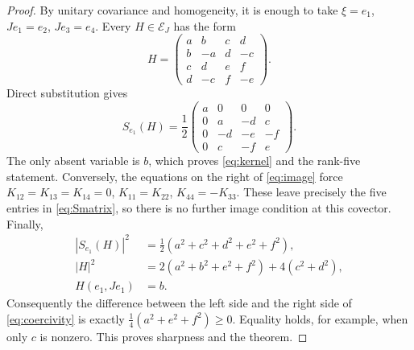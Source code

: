 \documentclass[11pt,a4paper]{article}
\numberwithin{equation}{section}
\theoremstyle{definition}\newtheorem{hypothesis}[theorem]{Input}
\theoremstyle{remark}\newtheorem{remark}[theorem]{Remark}
\begin{document}
\begin{proof}
By unitary covariance and homogeneity, it is enough to take $\xi=e_1$,
$Je_1=e_2$, $Je_3=e_4$.  Every $H\in\mathcal E_J$ has the form
\begin{equation}\label{eq:Hmatrix}
 H=\begin{pmatrix}
 a&b&c&d\\ b&-a&d&-c\\ c&d&e&f\\ d&-c&f&-e
 \end{pmatrix}.
\end{equation}
Direct substitution gives
\begin{equation}\label{eq:Smatrix}
 S_{e_1}(H)=\frac12\begin{pmatrix}
 a&0&0&0\\0&a&-d&c\\0&-d&-e&-f\\0&c&-f&e
 \end{pmatrix}.
\end{equation}
The only absent variable is $b$, which proves \eqref{eq:kernel} and the
rank-five statement.  Conversely, the equations on the right of
\eqref{eq:image} force
$K_{12}=K_{13}=K_{14}=0$, $K_{11}=K_{22}$, $K_{44}=-K_{33}$.
These leave precisely the five entries in \eqref{eq:Smatrix}, so there is
no further image condition at this covector.
Finally,
\begin{align*}
 |S_{e_1}(H)|^2&=\tfrac12(a^2+c^2+d^2+e^2+f^2),\\
 |H|^2&=2(a^2+b^2+e^2+f^2)+4(c^2+d^2),\\
 H(e_1,Je_1)&=b.
\end{align*}
Consequently the difference between the left side and the right side of
\eqref{eq:coercivity} is exactly
$\tfrac14(a^2+e^2+f^2)\ge0$.  Equality holds, for example, when only $c$
is nonzero.  This proves sharpness and the theorem.
\end{proof}
\end{document}
